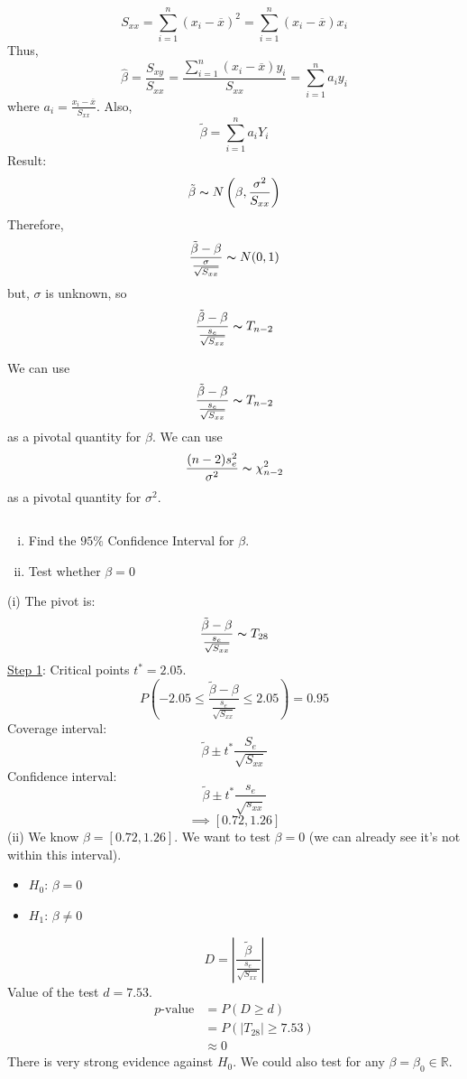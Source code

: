 \[ S_{xx}=\sum\limits_{i=1}^{n}(x_i-\overline{x})^2=\sum\limits_{i=1}^{n} (x_i-\overline{x})x_i \]
Thus,
\[ \hat{\beta}=\frac{S_{xy}}{S_{xx}}=\frac{\sum\limits_{i=1}^{n} (x_i-\overline{x})y_i}{S_{xx}}=\sum\limits_{i=1}^{n} a_iy_i  \]
where $ a_i=\frac{x_i-\overline{x}}{S_{xx}} $.
Also,
\[ \tilde{\beta}=\sum\limits_{i=1}^{n} a_iY_i \]
Result:
\[ \tilde{\beta} \thicksim N\left(\beta,\frac{\sigma^2}{S_{xx}}\right) \]
Therefore,
\[ \frac{\tilde{\beta}-\beta}{\frac{\sigma}{\sqrt{S_{xx}}}} \thicksim N(0,1) \]
but, $ \sigma $ is unknown, so
\[ \frac{\tilde{\beta}-\beta}{\frac{s_e}{\sqrt{S_{xx}}}} \thicksim T_{n-2}  \]
\begin{thmbox}
    \begin{theorem} We can use
        \[ \frac{\tilde{\beta}-\beta}{\frac{s_e}{\sqrt{S_{xx}}}} \thicksim T_{n-2} \]
        as a pivotal quantity for $ \beta $. We can use
        \[ \frac{(n-2)s_e^2}{\sigma^2} \thicksim \chi^2_{n-2} \]
        as a pivotal quantity for $ \sigma^2 $.
    \end{theorem}
\end{thmbox}
\begin{exbox}
    \begin{example} $ \; $
        \begin{enumerate}[(i)]
            \item Find the $ 95\% $ Confidence Interval for $ \beta $.
            \item Test whether $ \beta=0 $
        \end{enumerate}
        (i) The pivot is:
        \[ \frac{\tilde{\beta}-\beta}{\frac{s_e}{\sqrt{S_{xx}}}} \thicksim T_{28} \]
        \underline{Step 1}: Critical points $ t^*=2.05 $.
        \[ P(-2.05\leqslant \frac{\tilde{\beta}-\beta}{\frac{s_e}{\sqrt{S_{xx}}}}\leqslant 2.05)=0.95\]
        Coverage interval:
        \[ \tilde{\beta}\pm t^* \frac{S_e}{\sqrt{S_{xx}}} \]
        Confidence interval:
        \[ \tilde{\beta}\pm t^* \frac{s_e}{\sqrt{s_{xx}}} \]
        \[ \implies [0.72,1.26] \]
        (ii) We know $ \beta=[0.72,1.26] $. We want to test $ \beta=0 $ (we can already see it's
        not within this interval).
        \begin{itemize}
            \item $ H_0 $: $ \beta=0 $
            \item $ H_1 $: $ \beta\neq 0 $
        \end{itemize}
        \[ D=\left|\frac{\tilde{\beta}}{\frac{s_e}{\sqrt{S_{xx}}}}\right| \]
        Value of the test $ d=7.53 $.
        \begin{align*}
            p\text{-value}
             & =P(D\geqslant d)           \\
             & =P(|T_{28}|\geqslant 7.53) \\
             & \approx 0
        \end{align*}
        There is very strong evidence against $ H_0 $.
        We could also test for any $ \beta=\beta_0\in\mathbb{R} $.
    \end{example}
\end{exbox}
